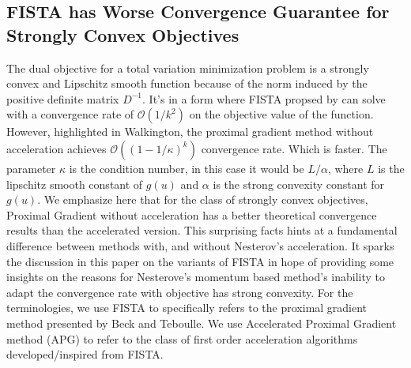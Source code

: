 \documentclass[]{article}
\theoremstyle{definition}
\numberwithin{equation}{subsection}
\begin{document}
    \subsection{FISTA has Worse Convergence Guarantee for Strongly Convex Objectives}
        The dual objective for a total variation minimization problem is a strongly convex and Lipschitz smooth function because of the norm induced by the positive definite matrix $D^{-1}$. 
        It's in a form where FISTA propsed by \cite{beck_fast_2009-1} can solve with a convergence rate of $\mathcal O(1/k^2)$ on the objective value of the function. 
        However, highlighted in Walkington\cite{noel_nesterovs_nodate}, the proximal gradient method without acceleration achieves $\mathcal O((1 - 1/\kappa)^k)$ convergence rate. 
        Which is faster.
        The parameter $\kappa$ is the condition number, in this case it would be $L/\alpha$, where $L$ is the lipschitz smooth constant of $g(u)$ and $\alpha$ is the strong convexity constant for $g(u)$. 
        We emphasize here that for the class of strongly convex objectives, Proximal Gradient without acceleration has a better theoretical convergence results than the accelerated version. 
        This surprising facts hints at a fundamental difference between methods with, and without Nesterov's acceleration. 
        It sparks the discussion in this paper on the variants of FISTA in hope of providing some insights on the reasons for Nesterove's momentum based method's inability to adapt the convergence rate with objective has strong convexity. 
        For the terminologies, we use FISTA to specifically refers to the proximal gradient method presented by Beck and Teboulle\cite{beck_fast_2009-1}. We use Accelerated Proximal Gradient method (APG) to refer to the class of first order acceleration algorithms developed/inspired from FISTA. 
\end{document}
